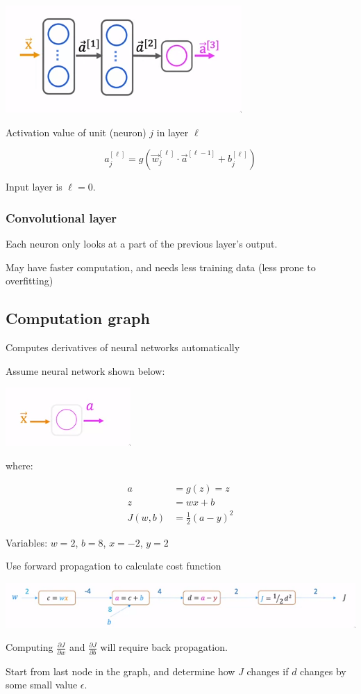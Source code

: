 \documentclass[12pt]{article}
\begin{document}
\includegraphics{nn/dense_layer}

Activation value of unit (neuron) $j$ in layer $\ell$

\[ a_j^{[\ell]} = g(\vec{w}_j^{[\ell]} \cdot \vec{a}^{[\ell - 1]} + b_j^{[\ell]}) \]

Input layer is $\ell = 0$.

\subsubsection*{Convolutional layer}

Each neuron only looks at a part of the previous layer's output.

May have faster computation, and needs less training data (less prone to overfitting)

\subsection{Computation graph}

Computes derivatives of neural networks automatically

Assume neural network shown below:

\includegraphics{nn/compgraph-ex/nn}

where:

\begin{align*}
a &= g(z) = z\\
z &= wx + b\\
J(w,b) &= \frac{1}{2} (a-y)^2
\end{align*}

Variables: $w = 2$, $b = 8$, $x = -2$, $y = 2$

\pagebreak

Use forward propagation to calculate cost function

\includegraphics[scale=.8]{nn/compgraph-ex/compgraph}

Computing $\frac{\partial J}{\partial w}$ and $\frac{\partial J}{\partial b}$ will require back propagation.

Start from last node in the graph, and determine how $J$ changes if $d$ changes by some small value $\epsilon$.
\end{document}
